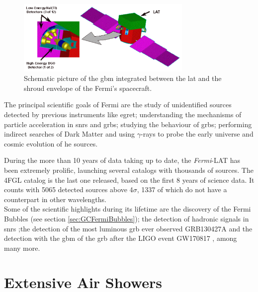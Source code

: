 \documentclass[main.tex]{subfiles}
\begin{document}
\begin{itemize}
    
    \begin{figure}
    \centering
    \includegraphics[width=0.75\textwidth]{Pictures/GBM.pdf}
    \caption{Schematic picture of the \gls{gbm} integrated between the \gls{lat} and the shroud envelope of the Fermi's spacecraft.}
    \label{fig:GBM}
    \end{figure}
    
\end{itemize}

The principal scientific goals of Fermi are the study of unidentified sources detected by previous instruments like \gls{egret}; understanding the mechanisms of particle acceleration in \glspl{snr} and \glspl{grb}; studying the behaviour of \glspl{grb}; performing indirect searches of Dark Matter and using $\gamma$-rays to probe the early universe and cosmic evolution of \gls{he} sources.

During the more than 10 years of data taking up to date, the \textit{Fermi}-LAT has been extremely prolific, launching several catalogs with thousands of sources. The 4FGL catalog is the last one released, based on the first 8 years of science data. It counts with 5065 detected sources above 4$\sigma$, 1337 of which do not have a counterpart in other wavelengths.\\
Some of the scientific highlights during its lifetime are the discovery of the Fermi Bubbles (see section \ref{sec:GCFermiBubbles}); the detection of hadronic signals in \glspl{snr} \cite{2013fermionSNRpiondecay};the detection of the most luminous \gls{grb} ever observed GRB130427A \cite{2014fermisuperGRB} and the detection with the \gls{gbm} of the \gls{grb} after the LIGO event GW170817 \cite{grb170817}, among many more. 

\section{Extensive Air Showers} \label{sec:eas}
\end{document}
